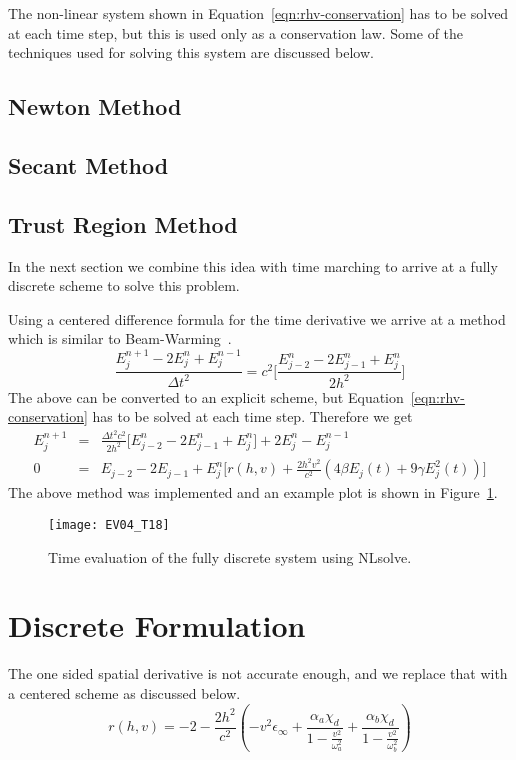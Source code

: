 \documentclass{article}[12pt]
\theoremstyle{plain}
\begin{document}
The non-linear system shown in Equation~\ref{eqn:rhv-conservation} has to be solved at each time step, but this is used only as a conservation
law. Some of the techniques used for solving this system are discussed below.

\subsection{Newton Method}
\subsection{Secant Method}
\subsection{Trust Region Method}

In the next section we combine this idea with time marching to arrive at a fully discrete scheme to solve this problem.

Using a centered difference formula for the time derivative we arrive at a method which is similar to Beam-Warming~\cite{leveque2007finite}.
\begin{equation}
\frac{E_j^{n+1}-2E_j^n+E_j^{n-1}}{\Delta t^2} = c^2\Big[ \frac{E_{j-2}^n - 2E_{j-1}^n + E_j^n}{2h^2}\Big]
\end{equation}
The above can be converted to an explicit scheme, but Equation~\ref{eqn:rhv-conservation} has to be solved at each time step.
Therefore we get
\begin{eqnarray}
E_j^{n+1} & = & \frac{\Delta t^2 c^2}{2h^2}\Big[ E_{j-2}^n - 2E_{j-1}^n + E_j^n\Big] + 2E_j^n - E_j^{n-1} \nonumber \\
0 & = & E_{j-2}-2E_{j-1}+E_j^n\Big[ r(h,v) + \frac{2h^2 v^2}{c^2}( 4\beta E_j(t) + 9\gamma E_j^2(t))\Big]
\end{eqnarray}
The above method was implemented and an example plot is shown in Figure~\ref{fig:nlsolve}.

\begin{figure}
\begin{center}
\texttt{[image: EV04\_T18]}
\caption{Time evaluation of the fully discrete system using NLsolve.}
\label{fig:nlsolve}
\end{center}
\end{figure}


\section{Discrete Formulation}
The one sided spatial derivative is not accurate enough, and we replace that with a centered
scheme as discussed below.
\begin{equation}
r(h,v) = -2-\frac{2h^2}{c^2}(-v^2\epsilon_\infty + \frac{\alpha_a \chi_d }{1-\frac{v^2}{\omega_a^2}} 
+ \frac{\alpha_b \chi_d }{1-\frac{v^2}{\omega_b^2}}) \label{eqn:rhv2}
\end{equation}
\end{document}
